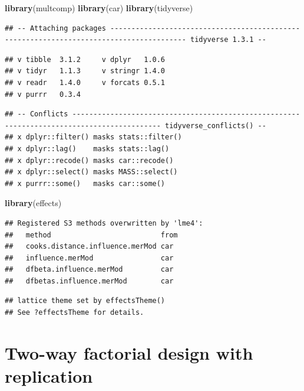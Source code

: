 \documentclass[
  12pt,
]{book}
\newenvironment{Shaded}{\begin{snugshade}}{\end{snugshade}}
\newcommand{\KeywordTok}[1]{\textcolor[rgb]{0.13,0.29,0.53}{\textbf{#1}}}
\newcommand{\NormalTok}[1]{#1}
\begin{document}
\begin{Shaded}
\begin{Highlighting}[]
\KeywordTok{library}\NormalTok{(multcomp)}
\KeywordTok{library}\NormalTok{(car)}
\KeywordTok{library}\NormalTok{(tidyverse)}
\end{Highlighting}
\end{Shaded}

\begin{verbatim}
## -- Attaching packages ---------------------------------------------------------------------------------------- tidyverse 1.3.1 --
\end{verbatim}

\begin{verbatim}
## v tibble  3.1.2     v dplyr   1.0.6
## v tidyr   1.1.3     v stringr 1.4.0
## v readr   1.4.0     v forcats 0.5.1
## v purrr   0.3.4
\end{verbatim}

\begin{verbatim}
## -- Conflicts ------------------------------------------------------------------------------------------- tidyverse_conflicts() --
## x dplyr::filter() masks stats::filter()
## x dplyr::lag()    masks stats::lag()
## x dplyr::recode() masks car::recode()
## x dplyr::select() masks MASS::select()
## x purrr::some()   masks car::some()
\end{verbatim}

\begin{Shaded}
\begin{Highlighting}[]
\KeywordTok{library}\NormalTok{(effects)}
\end{Highlighting}
\end{Shaded}

\begin{verbatim}
## Registered S3 methods overwritten by 'lme4':
##   method                          from
##   cooks.distance.influence.merMod car 
##   influence.merMod                car 
##   dfbeta.influence.merMod         car 
##   dfbetas.influence.merMod        car
\end{verbatim}

\begin{verbatim}
## lattice theme set by effectsTheme()
## See ?effectsTheme for details.
\end{verbatim}

\hypertarget{two-way-factorial-design-with-replication}{%
\section{Two-way factorial design with replication}\label{two-way-factorial-design-with-replication}}
\end{document}
